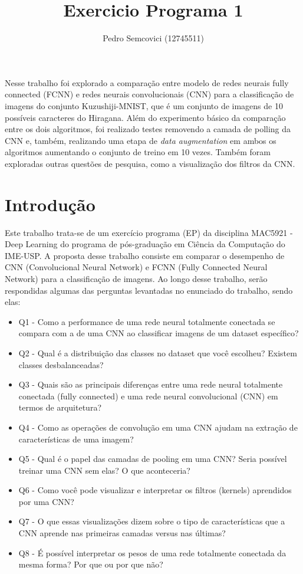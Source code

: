 \documentclass[12pt]{article}
\title{Exercicio Programa 1}
\author{Pedro Semcovici (12745511) }
\begin{document}
 

\maketitle
     
\begin{resumo} 
Nesse trabalho foi explorado a comparação entre modelo de redes neurais fully connected (FCNN) e redes neurais convolucionais (CNN) para a classificação de imagens do conjunto Kuzushiji-MNIST, que é um conjunto de imagens de 10 possíveis caracteres do Hiragana. Além do experimento básico da comparação entre os dois algoritmos, foi realizado testes removendo a camada de polling da CNN e, também, realizando uma etapa de \textit{data augmentation} em ambos os algoritmos aumentando o conjunto de treino em 10 vezes. Também foram exploradas outras questões de pesquisa, como a visualização dos filtros da CNN.

\end{resumo}


\section{Introdução}
Este trabalho trata-se de um exercício programa (EP) da  disciplina MAC5921 - Deep Learning do programa de pós-graduação em Ciência da Computação do IME-USP. A proposta desse trabalho consiste em comparar o desempenho de CNN (Convolucional Neural Network) e FCNN (Fully Connected Neural Network) para a classificação de imagens. Ao longo desse trabalho, serão respondidas algumas das perguntas levantadas no enunciado do trabalho, sendo elas:

\begin{itemize}
  \item Q1 - Como a performance de uma rede neural totalmente conectada se compara com a de uma CNN ao classificar imagens de um dataset específico?
  \item Q2 - Qual é a distribuição das classes no dataset que você escolheu? Existem classes desbalanceadas?
  \item Q3 - Quais são as principais diferenças entre uma rede neural totalmente conectada (fully connected) e uma rede neural convolucional (CNN) em termos de arquitetura?
  \item Q4 - Como as operações de convolução em uma CNN ajudam na extração de características de uma imagem?
  \item Q5 - Qual é o papel das camadas de pooling em uma CNN? Seria possível treinar uma CNN sem elas? O que aconteceria?
  \item Q6 - Como você pode visualizar e interpretar os filtros (kernels) aprendidos por uma CNN?
  \item Q7 - O que essas visualizações dizem sobre o tipo de características que a CNN aprende nas primeiras camadas versus nas últimas?
  \item Q8 - É possível interpretar os pesos de uma rede totalmente conectada da mesma forma? Por que ou por que não?
\end{itemize}
\end{document}
